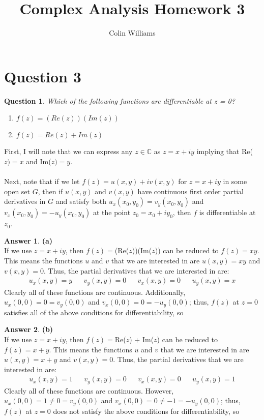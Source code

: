 \documentclass[10pt,a4paper]{article}
\title{Complex Analysis Homework 3}
\author{Colin Williams}
\newtheorem*{question*}{Question}
\theoremstyle{definition}
\newtheorem*{answer*}{Answer}
\begin{document}
\maketitle
\section*{Question 3}
\begin{question*}
Which of the following functions are differentiable at z = 0?
\begin{enumerate}[label = (\alph*)]
\item $f(z) = (Re(z))(Im(z))$
\item $f(z) = Re(z) + Im(z)$
\end{enumerate}
\end{question*}

First, I will note that we can express any $z \in \mathbb{C}$ as $z = x + iy$ implying that Re($z) = x$ and Im($z) = y$.\\
\\Next, note that if we let $f(z) = u(x,y) + iv(x,y)$ for $z = x + iy$ in some open set $G$, then if $u(x, y)$ and $v(x, y)$ have continuous first order partial derivatives in $G$ and satisfy both $u_x(x_0, y_0) = v_y(x_0,y_0)$ and $v_x(x_0,y_0) = -u_y(x_0,y_0)$ at the point $z_0 = x_0 + iy_0$, then $f$ is differentiable at $z_0$.

\begin{answer*}{\textbf{(a)}}
\\If we use $z = x + iy$, then $f(z) = $(Re($z$))(Im($z$)) can be reduced to $f(z) = xy$. This means the functions $u$ and $v$ that we are interested in are $u(x, y) = xy$ and $v(x, y) = 0$. Thus, the partial derivatives that we are interested in are:
\begin{align*}
u_x(x, y) = y && v_y(x, y) = 0 && v_x(x, y) = 0 && u_y(x, y) = x
\end{align*}
Clearly all of these functions are continuous. Additionally, $u_x(0,0) = 0 = v_y(0,0)$ and $v_x(0,0) = 0 = -u_y(0,0)$; thus, $f(z)$ at $z = 0$ satisfies all of the above conditions for differentiability, so 
\end{answer*}

\begin{answer*}{\textbf{(b)}}
\\If we use $z = x + iy$, then $f(z) = $Re($z$) + Im($z$) can be reduced to $f(z) = x + y$. This means the functions $u$ and $v$ that we are interested in are $u(x, y) = x + y$ and $v(x, y) = 0$. Thus, the partial derivatives that we are interested in are:
\begin{align*}
u_x(x, y) = 1 && v_y(x, y) = 0 && v_x(x, y) = 0 && u_y(x, y) = 1
\end{align*}
Clearly all of these functions are continuous. However, $u_x(0,0) = 1 \neq 0 = v_y(0,0)$ and $v_x(0,0) = 0 \neq -1 = -u_y(0,0)$; thus, $f(z)$ at $z = 0$ does not satisfy the above conditions for differentiability, so 
\end{answer*}
\end{document}
